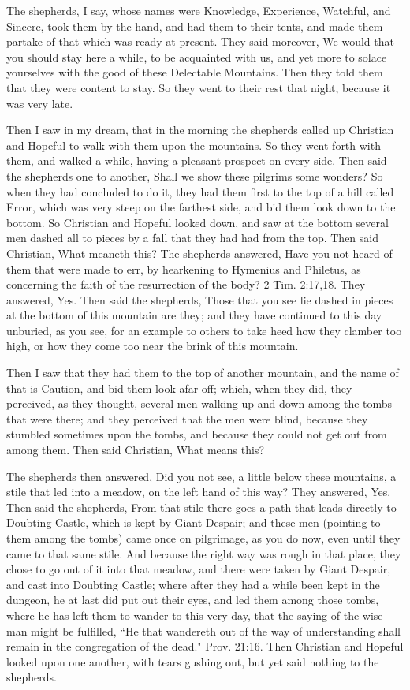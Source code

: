 The shepherds, I say, whose names were Knowledge, Experience, Watchful, and Sincere, took them by the hand, and had them to their tents, and made them partake of that which was ready at present. They said moreover, We would that you should stay here a while, to be acquainted with us, and yet more to solace yourselves with the good of these Delectable Mountains. Then they told them that they were content to stay. So they went to their rest that night, because it was very late.

Then I saw in my dream, that in the morning the shepherds called up Christian and Hopeful to walk with them upon the mountains. So they went forth with them, and walked a while, having a pleasant prospect on every side. Then said the shepherds one to another, Shall we show these pilgrims some wonders? So when they had concluded to do it, they had them first to the top of a hill called Error, which was very steep on the farthest side, and bid them look down to the bottom. So Christian and Hopeful looked down, and saw at the bottom several men dashed all to pieces by a fall that they had had from the top. Then said Christian, What meaneth this? The shepherds answered, Have you not heard of them that were made to err, by hearkening to Hymenius and Philetus, as concerning the faith of the resurrection of the body? 2 Tim. 2:17,18. They answered, Yes. Then said the shepherds, Those that you see lie dashed in pieces at the bottom of this mountain are they; and they have continued to this day unburied, as you see, for an example to others to take heed how they clamber too high, or how they come too near the brink of this mountain.

Then I saw that they had them to the top of another mountain, and the name of that is Caution, and bid them look afar off; which, when they did, they perceived, as they thought, several men walking up and down among the tombs that were there; and they perceived that the men were blind, because they stumbled sometimes upon the tombs, and because they could not get out from among them. Then said Christian, What means this?

The shepherds then answered, Did you not see, a little below these mountains, a stile that led into a meadow, on the left hand of this way? They answered, Yes. Then said the shepherds, From that stile there goes a path that leads directly to Doubting Castle, which is kept by Giant Despair; and these men (pointing to them among the tombs) came once on pilgrimage, as you do now, even until they came to that same stile. And because the right way was rough in that place, they chose to go out of it into that meadow, and there were taken by Giant Despair, and cast into Doubting Castle; where after they had a while been kept in the dungeon, he at last did put out their eyes, and led them among those tombs, where he has left them to wander to this very day, that the saying of the wise man might be fulfilled, ``He that wandereth out of the way of understanding shall remain in the congregation of the dead." Prov. 21:16. Then Christian and Hopeful looked upon one another, with tears gushing out, but yet said nothing to the shepherds.

